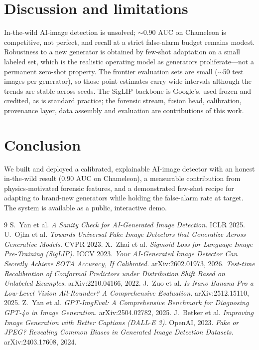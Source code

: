 \documentclass[11pt]{article}
\begin{document}
\section{Discussion and limitations}
In-the-wild AI-image detection is unsolved; $\sim$0.90 AUC on Chameleon is competitive,
not perfect, and recall at a strict false-alarm budget remains modest. Robustness to a
new generator is obtained by few-shot adaptation on a small labeled set, which is the
realistic operating model as generators proliferate---not a permanent zero-shot
property. The frontier evaluation sets are small ($\sim$50 test images per generator),
so those point estimates carry wide intervals although the trends are stable across
seeds. The SigLIP backbone is Google's, used frozen and credited, as is standard
practice; the forensic stream, fusion head, calibration, provenance layer, data
assembly and evaluation are contributions of this work.

\section{Conclusion}
We built and deployed a calibrated, explainable AI-image detector with an honest
in-the-wild result ($0.90$ AUC on Chameleon), a measurable contribution from
physics-motivated forensic features, and a demonstrated few-shot recipe for adapting to
brand-new generators while holding the false-alarm rate at target. The system is
available as a public, interactive demo.

\begin{thebibliography}{9}
 S.~Yan et al. \emph{A Sanity Check for AI-Generated Image Detection.} ICLR 2025.
 U.~Ojha et al. \emph{Towards Universal Fake Image Detectors that Generalize Across Generative Models.} CVPR 2023.
 X.~Zhai et al. \emph{Sigmoid Loss for Language Image Pre-Training (SigLIP).} ICCV 2023.
 \emph{Your AI-Generated Image Detector Can Secretly Achieve SOTA Accuracy, If Calibrated.} arXiv:2602.01973, 2026.
 \emph{Test-time Recalibration of Conformal Predictors under Distribution Shift Based on Unlabeled Examples.} arXiv:2210.04166, 2022.
 J.~Zuo et al. \emph{Is Nano Banana Pro a Low-Level Vision All-Rounder? A Comprehensive Evaluation.} arXiv:2512.15110, 2025.
 Z.~Yan et al. \emph{GPT-ImgEval: A Comprehensive Benchmark for Diagnosing GPT-4o in Image Generation.} arXiv:2504.02782, 2025.
 J.~Betker et al. \emph{Improving Image Generation with Better Captions (DALL$\cdot$E 3).} OpenAI, 2023.
 \emph{Fake or JPEG? Revealing Common Biases in Generated Image Detection Datasets.} arXiv:2403.17608, 2024.
\end{thebibliography}
\end{document}
